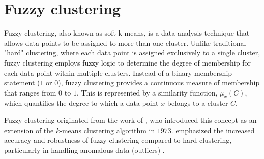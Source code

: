 \section{Fuzzy clustering}
Fuzzy clustering, also known as soft k-means, is a data analysis technique that allows data points to be assigned to more than one cluster. Unlike traditional "hard" clustering, where each data point is assigned exclusively to a single cluster, fuzzy clustering employs fuzzy logic to determine the degree of membership for each data point within multiple clusters. Instead of a binary membership statement ($1$ or $0$), fuzzy clustering provides a continuous measure of membership that ranges from $0$ to $1$. This is represented by a similarity function, $\mu_x(C)$, which quantifies the degree to which a data point $x$ belongs to a cluster $C$.

\noindent Fuzzy clustering originated from the work of \citeauthor{FuzzyClustering_developDoc}, who introduced this concept as an extension of the $k$-means clustering algorithm in $1973$. \citeauthor{FuzzyClustering_developDoc} emphasized the increased accuracy and robustness of fuzzy clustering compared to hard clustering, particularly in handling anomalous data (outliers) \citep{FuzzyClustering_developDoc}.

